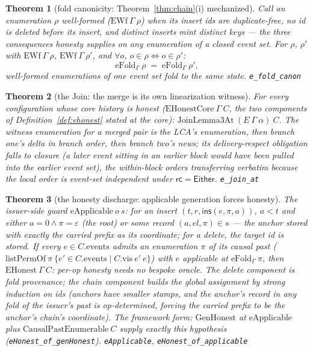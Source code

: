 \documentclass[11pt]{article}
\newtheorem{theorem}{Theorem}[section]
\newcommand{\rcrel}{\mathsf{rc}}                 %
\newcommand{\lean}[1]{\texttt{#1}}
\newcommand{\ins}{\mathsf{ins}}
\newcommand{\Either}{\textsf{Either}}
\begin{document}
\begin{theorem}[fold canonicity: Theorem~\ref{thm:chain}(i)
mechanized]
\label{thm:efoldcanon}
Call an enumeration $\rho$ \emph{well-formed}
($\mathrm{EWf}\ \Gamma\ \rho$) when its insert ids are
duplicate-free, no id is deleted before its insert, and distinct
inserts mint distinct keys --- the three consequences honesty
supplies on any enumeration of a closed event set. For $\rho$,
$\rho'$ with $\mathrm{EWf}\ \Gamma\ \rho$, $\mathrm{EWf}\ \Gamma\
\rho'$, and $\forall o$, $o \in \rho \iff o \in \rho'$:
\[
  \mathrm{eFold}_\Gamma\ \rho \;=\; \mathrm{eFold}_\Gamma\ \rho' ,
\]
well-formed enumerations of one event set fold to the \emph{same}
state.
\hfill\lean{e\_fold\_canon}
\end{theorem}

\begin{theorem}[the Join: the merge is its own linearization
witness]
\label{thm:ejoin}
For every configuration whose core history is honest
($\mathrm{EHonestCore}\ \Gamma\ C$, the two components of
Definition~\ref{def:ehonest} stated at the core):
$\mathrm{JoinLemma3At}\ (E\ \Gamma\ \alpha)\ C$. The witness
enumeration for a merged pair is the LCA's enumeration, then branch
one's delta in branch order, then branch two's news; its
delivery-respect obligation falls to closure (a later event sitting
in an earlier block would have been pulled into the earlier event
set), the within-block orders transferring verbatim because the
local order is event-set independent under $\rcrel = \Either$.
\hfill\lean{e\_join\_at}
\end{theorem}

\begin{theorem}[the honesty discharge: applicable generation forces
honesty]
\label{thm:ehonestapp}
The issuer-side guard $\mathrm{eApplicable}\ o\ s$: for an insert
$(t, r, \ins(e, \pi, a))$, $a < t$ and either $a = 0 \wedge \pi =
\varepsilon$ (the root) or some record $(a, \mathit{el}, \pi) \in s$
--- the anchor stored with \emph{exactly} the carried prefix as its
coordinate; for a delete, the target id is stored. If every $e \in
C.\mathrm{events}$ admits an enumeration $\pi$ of its causal past
($\mathrm{listPermOf}\ \pi\ \{e' \in C.\mathrm{events} \mid
C.\mathrm{vis}\ e'\ e\}$) with $e$ applicable at
$\mathrm{eFold}_\Gamma\ \pi$, then $\mathrm{EHonest}\ \Gamma\ C$:
per-op honesty needs no bespoke oracle. The delete component is fold
provenance; the chain component builds the global assignment by
strong induction on ids (anchors have smaller stamps, and the
anchor's record in any fold of the issuer's past is op-determined,
forcing the carried prefix to be the anchor's chain's coordinate).
The framework form: $\mathrm{GenHonest}$ at $\mathrm{eApplicable}$
plus $\mathrm{CausalPastEnumerable}\ C$ supply exactly this
hypothesis (\lean{eHonest\_of\_genHonest}).
\hfill\lean{eApplicable}, \lean{eHonest\_of\_applicable}
\end{theorem}
\end{document}
